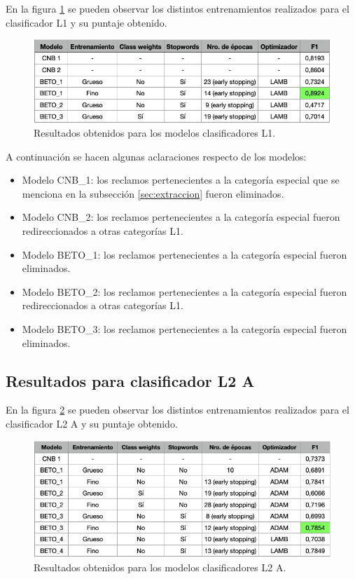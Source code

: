 En la figura \ref{fig:res-l1} se pueden observar los distintos entrenamientos realizados para el clasificador L1 y su puntaje obtenido.

\begin{figure}[htbp]
	\centering
	\includegraphics[width=1\textwidth]{./Figures/cap4-resultados-l1.png}
	\caption{Resultados obtenidos para los modelos clasificadores L1.}
	\label{fig:res-l1}
\end{figure}

A continuación se hacen algunas aclaraciones respecto de los modelos:
\begin{itemize}
	\item Modelo CNB\_1: los reclamos pertenecientes a la categoría especial que se menciona en la subsección \ref{sec:extraccion} fueron eliminados.
	\item Modelo CNB\_2: los reclamos pertenecientes a la categoría especial fueron redireccionados a otras categorías L1.
	\item Modelo BETO\_1: los reclamos pertenecientes a la categoría especial fueron eliminados.
	\item Modelo BETO\_2: los reclamos pertenecientes a la categoría especial fueron redireccionados a otras categorías L1.
	\item Modelo BETO\_3: los reclamos pertenecientes a la categoría especial fueron eliminados.
\end{itemize}

\newpage

\subsection{Resultados para clasificador L2 A}

En la figura \ref{fig:res-l2a} se pueden observar los distintos entrenamientos realizados para el clasificador L2 A y su puntaje obtenido.

\begin{figure}[H]
	\centering
	\includegraphics[width=1\textwidth]{./Figures/cap4-resultados-l2a.png}
	\caption{Resultados obtenidos para los modelos clasificadores L2 A.}
	\label{fig:res-l2a}
\end{figure}


